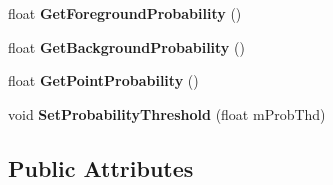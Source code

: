 \begin{DoxyCompactItemize}
float {\bfseries Get\+Foreground\+Probability} ()
\item 
\mbox{\label{classObjectPoint_a61341cca7866c30ed0965aafeb919405}} 
float {\bfseries Get\+Background\+Probability} ()
\item 
\mbox{\label{classObjectPoint_a0263c72ab207e6c9316015ea4f2d1a54}} 
float {\bfseries Get\+Point\+Probability} ()
\item 
\mbox{\label{classObjectPoint_a2a2238b78f8cb537e0d7c037ef3e420f}} 
void {\bfseries Set\+Probability\+Threshold} (float m\+Prob\+Thd)
\end{DoxyCompactItemize}
\subsection*{Public Attributes}
